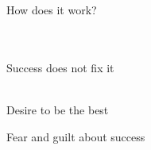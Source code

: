 \documentclass[aspectratio=169]{beamer}
\begin{document}
\begin{frame}
  \begin{center}
    \Huge How does it work?
    \\ \small \cite{hh15}
    \\ \small \cite{langford93}
    \\ \small \cite{colour}
  \end{center}
\end{frame}

\begin{frame}
  \begin{center}
    \Huge Success does not fix it
    \\ \small \cite{clanceimes78}
    \\ \small \cite{sakulku11}
  \end{center}
\end{frame}

\begin{frame}
  \begin{center}
    \Huge Desire to be the best
    \\ \small \cite{sakulku11}
  \end{center}
\end{frame}

\begin{frame}
  \begin{center}
    \Huge Fear and guilt about success
    \\ \small \cite{sakulku11}
  \end{center}
\end{frame}
\end{document}
